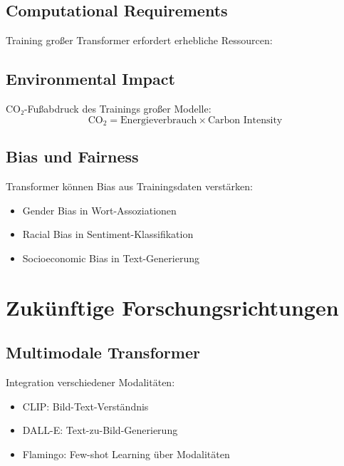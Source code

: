 \subsection{Computational Requirements}

Training großer Transformer erfordert erhebliche Ressourcen:

\subsection{Environmental Impact}

CO₂-Fußabdruck des Trainings großer Modelle:
\begin{equation}
\text{CO}_2 = \text{Energieverbrauch} \times \text{Carbon Intensity}
\end{equation}

\subsection{Bias und Fairness}

Transformer können Bias aus Trainingsdaten verstärken:
\begin{itemize}
    \item Gender Bias in Wort-Assoziationen
    \item Racial Bias in Sentiment-Klassifikation
    \item Socioeconomic Bias in Text-Generierung
\end{itemize}

\section{Zukünftige Forschungsrichtungen}

\subsection{Multimodale Transformer}

Integration verschiedener Modalitäten:
\begin{itemize}
    \item CLIP: Bild-Text-Verständnis
    \item DALL-E: Text-zu-Bild-Generierung
    \item Flamingo: Few-shot Learning über Modalitäten
\end{itemize}

